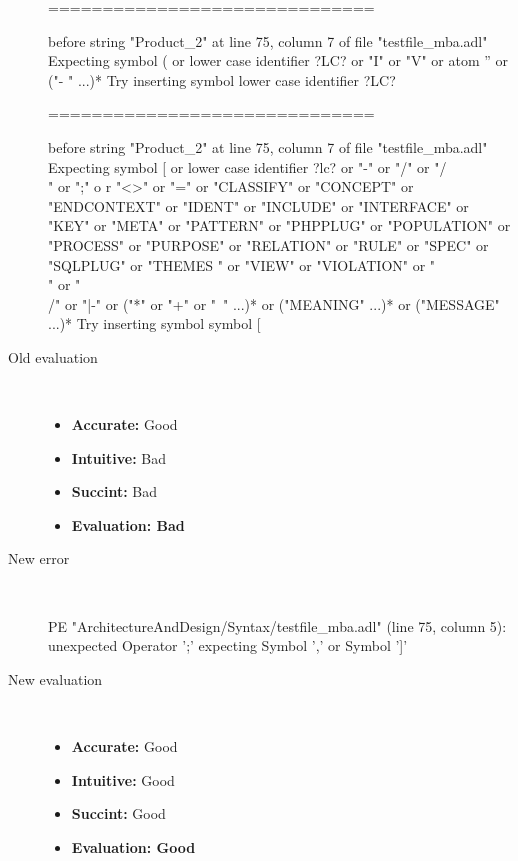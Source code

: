 \begin{description}
\begin{haskell}
==============================

before string "Product_2" at line 75, column 7 of file "testfile_mba.adl"
Expecting symbol ( or lower case identifier ?LC? or "I" or "V" or atom '' or ("-
" ...)*
Try inserting symbol lower case identifier ?LC?

==============================

before string "Product_2" at line 75, column 7 of file "testfile_mba.adl"
Expecting symbol [ or lower case identifier ?lc? or "-" or "/" or "/\\" or ";" o
r "<>" or "=" or "CLASSIFY" or "CONCEPT" or "ENDCONTEXT" or "IDENT" or "INCLUDE"
 or "INTERFACE" or "KEY" or "META" or "PATTERN" or "PHPPLUG" or "POPULATION" or
"PROCESS" or "PURPOSE" or "RELATION" or "RULE" or "SPEC" or "SQLPLUG" or "THEMES
" or "VIEW" or "VIOLATION" or "\\" or "\\/" or "|-" or ("*" or "+" or "~" ...)*
or ("MEANING" ...)* or ("MESSAGE" ...)*
Try inserting symbol symbol [
\end{haskell}
  \item[Old evaluation]~\\
    \begin{itemize}
    \item \textbf{Accurate:} Good
    \item \textbf{Intuitive:} Bad
    \item \textbf{Succint:} Bad
    \item \textbf{Evaluation: Bad}
    \end{itemize}
  \item[New error]~\\
\begin{haskell}
PE "ArchitectureAndDesign/Syntax/testfile_mba.adl" (line 75, column 5):
unexpected Operator ';'
expecting Symbol ',' or Symbol ']'\end{haskell}
  \item[New evaluation]~\\
    \begin{itemize}
    \item \textbf{Accurate:} Good
    \item \textbf{Intuitive:} Good
    \item \textbf{Succint:} Good
    \item \textbf{Evaluation: Good
}
    \end{itemize}
  \end{description}

